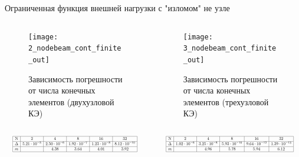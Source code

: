 \documentclass[7pt]{beamer}
\numberwithin{equation}{section}
\newcommand*{\Scale}[2][4]{\scalebox{#1}{$#2$}}
\begin{document}
	\begin{frame}{}
		Ограниченная функция внешней нагрузки с "изломом" не узле
			\begin{columns}
				\begin{column}{0.57\textwidth}
					\begin{figure}[H]
						\centering
						\texttt{[image: 2\_nodebeam\_cont\_finite\_out]}
						\caption{Зависимость погрешности от числа конечных элементов (двухузловой КЭ)}
						\label{fig:2_nodebeam_cont_finite_out}
					\end{figure}
				\end{column}
				\begin{column}{0.57\textwidth}
					\begin{figure}[H]
						\centering
						\texttt{[image: 3\_nodebeam\_cont\_finite\_out]}
						\caption{Зависимость погрешности от числа конечных элементов (трехузловой КЭ)}
						\label{fig:3_nodebeam_cont_finite_out}
					\end{figure}
				\end{column}
			\end{columns}
			\begin{columns}
				\begin{column}{0.5\textwidth}
					\[
						\Scale[0.5] {
								\begin{array}{|c|c|c|c|c|c|}
									\hline
									\text{N} & 2 & 4 & 8 & 16 & 32 \\ \hline
									\Delta  & 5.21 \cdot 10^{-5} & 2.50 \cdot 10^{-6} & 1.92 \cdot 10^{-7} & 1.23 \cdot 10^{-8} & 8.12 \cdot 10^{-10} \\ \hline
									m  &  & 4.38 & 3.64 & 4.01 & 3.92 \\ 
									\hline
										\end{array}
						}
					\]
				\end{column}
				\begin{column}{0.5\textwidth}
					\[
							\Scale[0.5] {
					\begin{array}{|c|c|c|c|c|c|}
					\hline
					\text{N} & 2 & 4 & 8 & 16 & 32\\ \hline
				\Delta  & 1.02 \cdot 10^{-6} & 3.25 \cdot 10^{-8} & 5.93 \cdot 10^{-10} & 9.64 \cdot 10^{-12} & 1.39 \cdot 10^{-13}\\ \hline
				m  &  &  4.96 & 5.78 & 5.94 & 6.12 \\ 
					\hline
					\end{array}
						}
						\]
				\end{column}
			\end{columns}
		\end{frame}
\end{document}
